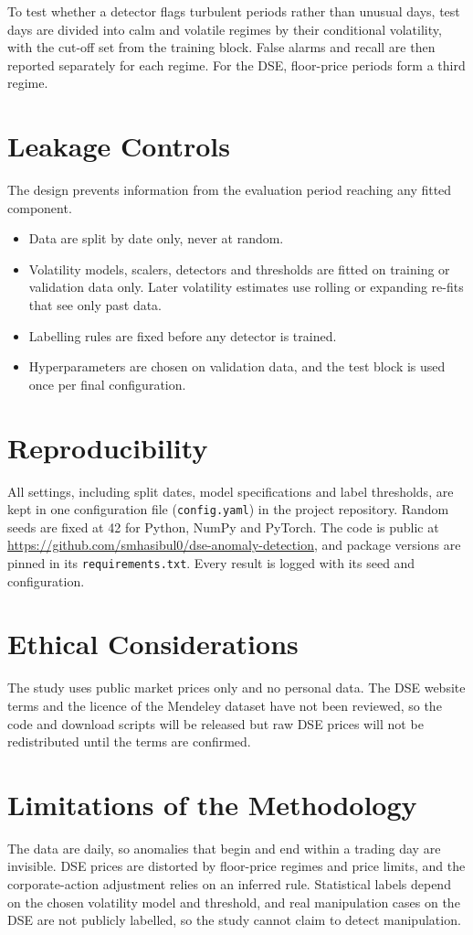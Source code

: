 To test whether a detector flags turbulent periods rather than unusual days, test days are
divided into calm and volatile regimes by their conditional volatility, with the cut-off set
from the training block. False alarms and recall are then reported separately for each
regime. For the DSE, floor-price periods form a third regime.

\section{Leakage Controls}
The design prevents information from the evaluation period reaching any fitted component.
\begin{itemize}
    \item Data are split by date only, never at random.
    \item Volatility models, scalers, detectors and thresholds are fitted on training or
    validation data only. Later volatility estimates use rolling or expanding re-fits that
    see only past data.
    \item Labelling rules are fixed before any detector is trained.
    \item Hyperparameters are chosen on validation data, and the test block is used once
    per final configuration.
\end{itemize}

\section{Reproducibility}
All settings, including split dates, model specifications and label thresholds, are kept in
one configuration file (\texttt{config.yaml}) in the project repository. Random seeds are
fixed at 42 for Python, NumPy and PyTorch. The code is public at
\url{https://github.com/smhasibul0/dse-anomaly-detection}, and package versions are pinned
in its \texttt{requirements.txt}. Every result is logged with its seed and configuration.

\section{Ethical Considerations}
The study uses public market prices only and no personal data. The DSE website terms and
the licence of the Mendeley dataset have not been reviewed, so the code and download
scripts will be released but raw DSE prices will not be redistributed until the terms are
confirmed.

\section{Limitations of the Methodology}
The data are daily, so anomalies that begin and end within a trading day are invisible.
DSE prices are distorted by floor-price regimes and price limits, and the corporate-action
adjustment relies on an inferred rule. Statistical labels depend on the chosen volatility
model and threshold, and real manipulation cases on the DSE are not publicly labelled, so
the study cannot claim to detect manipulation.

